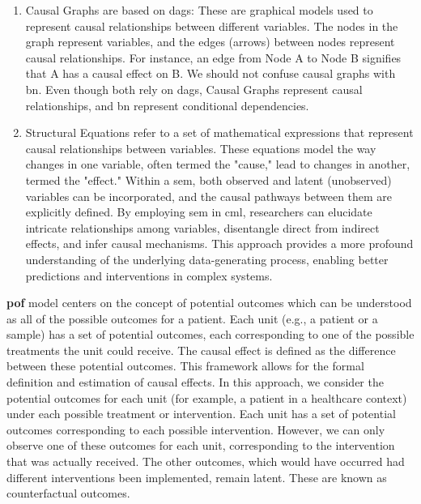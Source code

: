 \begin{enumerate}
    \item Causal Graphs are based on \acp{dag}: These are graphical models used to represent causal relationships between different variables. The nodes in the graph represent variables, and the edges (arrows) between nodes represent causal relationships. For instance, an edge from Node A to Node B signifies that A has a causal effect on B. We should not confuse causal graphs with \ac{bn}. Even though both rely on \acp{dag}, Causal Graphs represent causal relationships, and \ac{bn} represent conditional dependencies.
\item Structural Equations refer to a set of mathematical expressions that represent causal relationships between variables. These equations model the way changes in one variable, often termed the "cause," lead to changes in another, termed the "effect." Within a \ac{sem}, both observed and latent (unobserved) variables can be incorporated, and the causal pathways between them are explicitly defined. By employing \ac{sem} in \ac{cml}, researchers can elucidate intricate relationships among variables, disentangle direct from indirect effects, and infer causal mechanisms. This approach provides a more profound understanding of the underlying data-generating process, enabling better predictions and interventions in complex systems.

\end{enumerate}

\textbf{\Ac{pof}} model centers on the concept of potential outcomes which can be understood as all of the possible outcomes for a patient.  Each unit (e.g., a patient or a sample) has a set of potential outcomes, each corresponding to one of the possible treatments the unit could receive. The causal effect is defined as the difference between these potential outcomes. This framework allows for the formal definition and estimation of causal effects. In this approach, we consider the potential outcomes for each unit (for example, a patient in a healthcare context) under each possible treatment or intervention. Each unit has a set of potential outcomes corresponding to each possible intervention. However, we can only observe one of these outcomes for each unit, corresponding to the intervention that was actually received. The other outcomes, which would have occurred had different interventions been implemented, remain latent. These are known as counterfactual outcomes.

